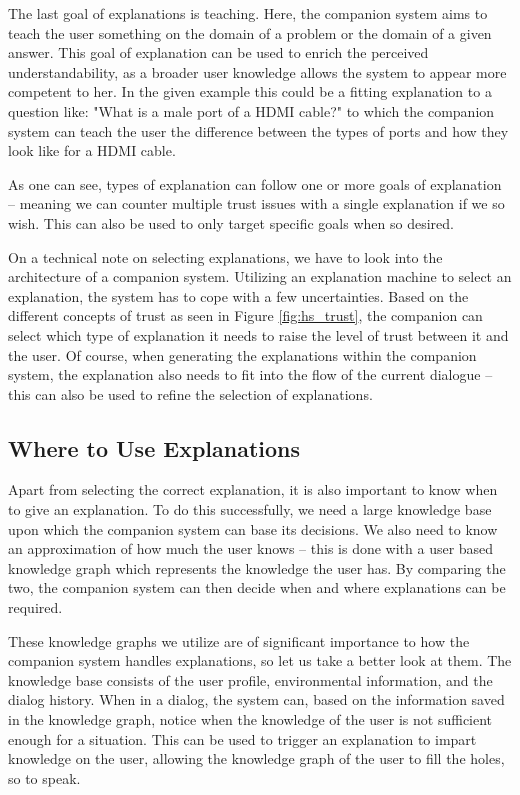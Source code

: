 \documentclass[a4paper]{article}
\begin{document}
The last goal of explanations is teaching. Here, the companion system aims to teach the user something on the domain of a problem or the domain of a given answer. This goal of explanation can be used to enrich the perceived understandability, as a broader user knowledge allows the system to appear more competent to her. In the given example this could be a fitting explanation to a question like: "What is a male port of a HDMI cable?" to which the companion system can teach the user the difference between the types of ports and how they look like for a HDMI cable.

As one can see, types of explanation can follow one or more goals of explanation – meaning we can counter multiple trust issues with a single explanation if we so wish. This can also be used to only target specific goals when so desired.

On a technical note on selecting explanations, we have to look into the architecture of a companion system. Utilizing an explanation machine to select an explanation, the system has to cope with a few uncertainties. Based on the different concepts of trust as seen in Figure \ref{fig:hs_trust}, the companion can select which type of explanation it needs to raise the level of trust between it and the user. Of course, when generating the explanations within the companion system, the explanation also needs to fit into the flow of the current dialogue – this can also be used to refine the selection of explanations.

\subsection{Where to Use Explanations}
\label{know_graph}

Apart from selecting the correct explanation, it is also important to know when to give an explanation. To do this successfully, we need a large knowledge base upon which the companion system can base its decisions. We also need to know an approximation of how much the user knows – this is done with a user based knowledge graph which represents the knowledge the user has. By comparing the two, the companion system can then decide when and where explanations can be required.

These knowledge graphs we utilize are of significant importance to how the companion system handles explanations, so let us take a better look at them. The knowledge base consists of the user profile, environmental information, and the dialog history. When in a dialog, the system can, based on the information saved in the knowledge graph, notice when the knowledge of the user is not sufficient enough for a situation. This can be used to trigger an explanation to impart knowledge on the user, allowing the knowledge graph of the user to fill the holes, so to speak.
\end{document}
